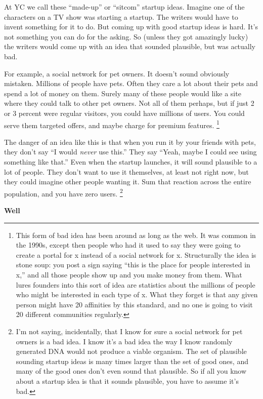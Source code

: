 \documentclass[12pt]{book}
\begin{document}
At YC we call these ``made-up'' or ``sitcom'' startup ideas. Imagine one
of the characters on a TV show was starting a startup. The writers would
have to invent something for it to do. But coming up with good startup
ideas is hard. It's not something you can do for the asking. So (unless
they got amazingly lucky) the writers would come up with an idea that
sounded plausible, but was actually bad.

For example, a social network for pet owners. It doesn't sound obviously
mistaken. Millions of people have pets. Often they care a lot about
their pets and spend a lot of money on them. Surely many of these people
would like a site where they could talk to other pet owners. Not all of
them perhaps, but if just 2 or 3 percent were regular visitors, you
could have millions of users. You could serve them targeted offers, and
maybe charge for premium features. \footnote{This form of bad idea has been around as long as the web. It was
common in the 1990s, except then people who had it used to say they were
going to create a portal for x instead of a social network for x.
Structurally the idea is stone soup: you post a sign saying ``this is
the place for people interested in x,'' and all those people show up and
you make money from them. What lures founders into this sort of idea are
statistics about the millions of people who might be interested in each
type of x. What they forget is that any given person might have 20
affinities by this standard, and no one is going to visit 20 different
communities regularly.}

The danger of an idea like this is that when you run it by your friends
with pets, they don't say ``I would \emph{never} use this.'' They say
``Yeah, maybe I could see using something like that.'' Even when the
startup launches, it will sound plausible to a lot of people. They don't
want to use it themselves, at least not right now, but they could
imagine other people wanting it. Sum that reaction across the entire
population, and you have zero users. \footnote{I'm not saying, incidentally, that I know for sure a social
network for pet owners is a bad idea. I know it's a bad idea the way I
know randomly generated DNA would not produce a viable organism. The set
of plausible sounding startup ideas is many times larger than the set of
good ones, and many of the good ones don't even sound that plausible. So
if all you know about a startup idea is that it sounds plausible, you
have to assume it's bad.}

\textbf{Well}
\end{document}
